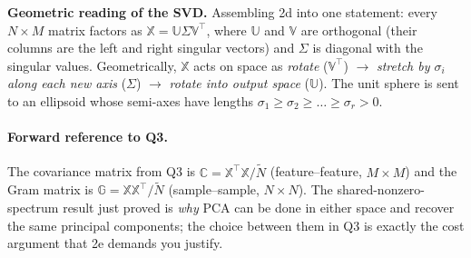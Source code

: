 \documentclass[12pt,a4paper]{article}
\begin{document}
\begin{insight}
\textbf{Geometric reading of the SVD.} Assembling 2d into one statement: every $N\times M$ matrix factors as $\mathbb{X} = \mathbb{U}\Sigma\mathbb{V}^\top$, where $\mathbb{U}$ and $\mathbb{V}$ are orthogonal (their columns are the left and right singular vectors) and $\Sigma$ is diagonal with the singular values. Geometrically, $\mathbb{X}$ acts on space as \emph{rotate} ($\mathbb{V}^\top$) $\to$ \emph{stretch by $\sigma_i$ along each new axis} ($\Sigma$) $\to$ \emph{rotate into output space} ($\mathbb{U}$). The unit sphere is sent to an ellipsoid whose semi-axes have lengths $\sigma_1\ge\sigma_2\ge\dots\ge\sigma_r > 0$.
\end{insight}

\paragraph{Forward reference to Q3.} The covariance matrix from Q3 is $\mathbb{C} = \mathbb{X}^\top\mathbb{X}/\tilde N$ (feature--feature, $M\times M$) and the Gram matrix is $\mathbb{G} = \mathbb{X}\mathbb{X}^\top/\tilde N$ (sample--sample, $N\times N$). The shared-nonzero-spectrum result just proved is \emph{why} PCA can be done in either space and recover the same principal components; the choice between them in Q3 is exactly the cost argument that 2e demands you justify.
\end{document}

